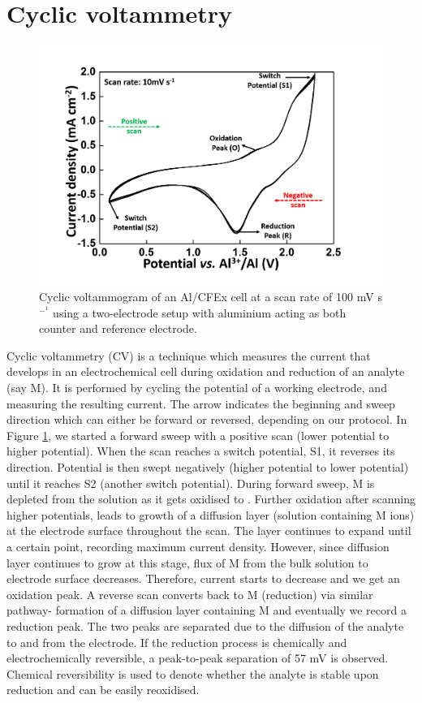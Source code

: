 \section{Cyclic voltammetry}
\begin{figure}[tbh!]
\centering
\includegraphics[width=\textwidth]{Figures/CV}
\caption{Cyclic voltammogram of an Al/CFEx cell at a scan rate of 100 mV s$^-^1$ using a two-electrode setup with aluminium acting as both counter and reference electrode. }
\label{Figures:CV}
\end{figure}
Cyclic voltammetry (CV) is a technique which measures the current that develops in an electrochemical cell during oxidation and reduction of an analyte (say M). It is performed by cycling the potential of a working electrode, and measuring the resulting current. The arrow indicates the beginning and sweep direction which can either be forward or reversed, depending on our protocol. In Figure \ref{Figures:CV}, we started a forward sweep with a positive scan (lower potential to higher potential). When the scan reaches a switch potential, S1, it reverses its direction. Potential is then swept negatively (higher potential to lower potential) until it reaches S2 (another switch potential). During forward sweep, M is depleted from the solution as it gets oxidised to . Further oxidation after scanning higher potentials, leads to growth of a diffusion layer (solution containing M ions) at the electrode surface throughout the scan. The layer continues to expand until a certain point, recording maximum current density. However, since diffusion layer continues to grow at this stage, flux of M from the bulk solution to electrode surface decreases. Therefore, current starts to decrease and we get an oxidation peak. A reverse scan converts  back to M (reduction) via similar pathway- formation of a diffusion layer containing M and eventually we record a reduction peak. The two peaks are separated due to the diffusion of the analyte to and from the electrode. If the reduction process is chemically and electrochemically reversible, a peak-to-peak separation of 57 mV is observed. Chemical reversibility is used to denote whether the analyte is stable upon reduction and can be easily reoxidised. 

